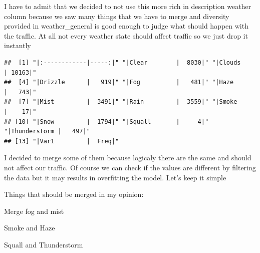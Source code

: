 \documentclass[
]{article}
\newenvironment{Shaded}{\begin{snugshade}}{\end{snugshade}}
\newcommand{\DataTypeTok}[1]{\textcolor[rgb]{0.13,0.29,0.53}{#1}}
\newcommand{\KeywordTok}[1]{\textcolor[rgb]{0.13,0.29,0.53}{\textbf{#1}}}
\newcommand{\NormalTok}[1]{#1}
\newcommand{\OperatorTok}[1]{\textcolor[rgb]{0.81,0.36,0.00}{\textbf{#1}}}
\newcommand{\OtherTok}[1]{\textcolor[rgb]{0.56,0.35,0.01}{#1}}
\newcommand{\StringTok}[1]{\textcolor[rgb]{0.31,0.60,0.02}{#1}}
\begin{document}
I have to admit that we decided to not use this more rich in description
weather column because we saw many things that we have to merge and
diversity provided in weather\_general is good enough to judge what
should happen with the traffic. At all not every weather state should
affect traffic so we just drop it instantly

\begin{Shaded}
\end{Shaded}

\begin{verbatim}
##  [1] "|:------------|-----:|" "|Clear        |  8030|" "|Clouds       | 10163|"
##  [4] "|Drizzle      |   919|" "|Fog          |   481|" "|Haze         |   743|"
##  [7] "|Mist         |  3491|" "|Rain         |  3559|" "|Smoke        |    17|"
## [10] "|Snow         |  1794|" "|Squall       |     4|" "|Thunderstorm |   497|"
## [13] "|Var1         |  Freq|"
\end{verbatim}

I decided to merge some of them because logicaly there are the same and
should not affect our traffic. Of course we can check if the values are
different by filtering the data but it may results in overfitting the
model. Let's keep it simple

Things that should be merged in my opinion:

Merge fog and mist

Smoke and Haze

Squall and Thunderstorm

\begin{Shaded}
\end{Shaded}
\end{document}
